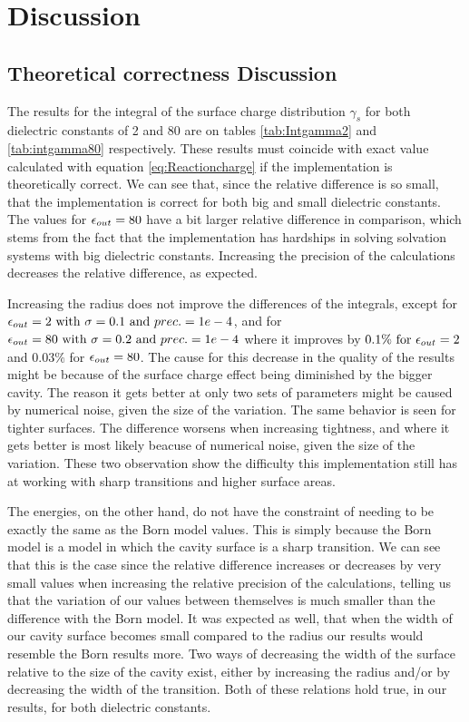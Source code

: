 \documentclass[../master_thesis.tex]{subfiles}
\begin{document}
\section{Discussion}
\subsection{Theoretical correctness Discussion}
The results for the integral of the surface charge distribution $\gamma_s$ for
both dielectric constants of 2 and 80 are on tables \ref{tab:Intgamma2} and \ref{tab:intgamma80}
respectively. These results must coincide with  exact value calculated with equation \ref{eq:Reactioncharge}
if the implementation is theoretically correct. We can see that, since the relative difference is
so small, that the implementation is correct for both big and small dielectric constants.
The values for $\epsilon_{out} = 80$ have a bit larger relative difference in comparison, which stems from
the fact that the implementation has hardships in solving solvation systems with big dielectric constants.
Increasing the precision of the calculations decreases the relative difference, as expected.

Increasing the radius does not improve the differences of the integrals, except for
$\epsilon_{out} = 2 \text{ with } \sigma = 0.1 \text{ and } prec. = 1e-4$, and for
$\epsilon_{out} = 80 \text{ with } \sigma = 0.2 \text{ and } prec. = 1e-4$ where it improves by
$0.1\% \text{ for } \epsilon_{out} = 2$ and $0.03\%$ for $\epsilon_{out} = 80$. The cause for
this decrease in the quality of the \mrchem results might be because of the surface
charge effect being diminished by the bigger cavity. The reason it gets better at
only two sets of parameters might be caused by numerical noise, given the size of
the variation.
The same  behavior is seen for tighter surfaces. The difference worsens
when increasing tightness, and where it gets better is most likely beacuse of numerical noise,
given the size of the variation. These two observation show the difficulty this implementation still
has at working with sharp transitions and higher surface areas.

The energies, on the other hand, do not have the constraint of needing to be exactly the same as
the Born model values. This is simply because the Born model is a model in which
the cavity surface is a sharp transition. We can see that this is the case since the
relative difference increases or decreases by very small  values when increasing the
relative precision of the calculations, telling us that
the variation of our values between themselves is much smaller than  the difference
with the Born model.
It was expected as well, that when the width of our cavity surface becomes small
compared to the radius our results would resemble
the Born results more. Two ways of decreasing the width of the surface relative to the
size of the cavity exist, either by increasing the  radius and/or by decreasing the width of the transition.
Both of these relations hold true, in our results, for both dielectric constants.
\end{document}
